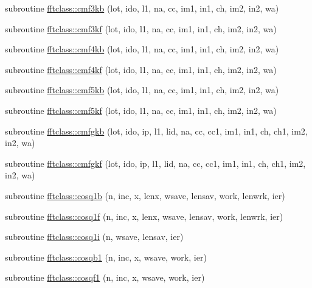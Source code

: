 \begin{DoxyCompactItemize}
\item 
subroutine \mbox{\hyperlink{namespacefftclass_afc9e57527719d38dc3716ee9bf6b090d}{fftclass\+::cmf3kb}} (lot, ido, l1, na, cc, im1, in1, ch, im2, in2, wa)
\item 
subroutine \mbox{\hyperlink{namespacefftclass_a449e799516aa491a87b0f5937a7abc86}{fftclass\+::cmf3kf}} (lot, ido, l1, na, cc, im1, in1, ch, im2, in2, wa)
\item 
subroutine \mbox{\hyperlink{namespacefftclass_ad51087e9f2795e7bf337d4c6b55de780}{fftclass\+::cmf4kb}} (lot, ido, l1, na, cc, im1, in1, ch, im2, in2, wa)
\item 
subroutine \mbox{\hyperlink{namespacefftclass_acdd67c6a77ecec55c036ab8899c07dee}{fftclass\+::cmf4kf}} (lot, ido, l1, na, cc, im1, in1, ch, im2, in2, wa)
\item 
subroutine \mbox{\hyperlink{namespacefftclass_a4bf0caaf1c5caeb50490706cd35d82c5}{fftclass\+::cmf5kb}} (lot, ido, l1, na, cc, im1, in1, ch, im2, in2, wa)
\item 
subroutine \mbox{\hyperlink{namespacefftclass_a59cb57b66516dd0b08cf36e366933c56}{fftclass\+::cmf5kf}} (lot, ido, l1, na, cc, im1, in1, ch, im2, in2, wa)
\item 
subroutine \mbox{\hyperlink{namespacefftclass_ab1c60a144232626a03fad4dd30f88d7d}{fftclass\+::cmfgkb}} (lot, ido, ip, l1, lid, na, cc, cc1, im1, in1, ch, ch1, im2, in2, wa)
\item 
subroutine \mbox{\hyperlink{namespacefftclass_a317b5c8887b5c2ecb7e518f0c7058589}{fftclass\+::cmfgkf}} (lot, ido, ip, l1, lid, na, cc, cc1, im1, in1, ch, ch1, im2, in2, wa)
\item 
subroutine \mbox{\hyperlink{namespacefftclass_a6684b378360642f160b255df6b3aa0bd}{fftclass\+::cosq1b}} (n, inc, x, lenx, wsave, lensav, work, lenwrk, ier)
\item 
subroutine \mbox{\hyperlink{namespacefftclass_a546e80f6eb00444bf4508ae26186e0d2}{fftclass\+::cosq1f}} (n, inc, x, lenx, wsave, lensav, work, lenwrk, ier)
\item 
subroutine \mbox{\hyperlink{namespacefftclass_ab281b0d26ef5d825f00696ab35e18e65}{fftclass\+::cosq1i}} (n, wsave, lensav, ier)
\item 
subroutine \mbox{\hyperlink{namespacefftclass_a4f908baf4cda5a6be5b71eb85fc9309c}{fftclass\+::cosqb1}} (n, inc, x, wsave, work, ier)
\item 
subroutine \mbox{\hyperlink{namespacefftclass_a894b76f80148bf5d923d558356a6cc1a}{fftclass\+::cosqf1}} (n, inc, x, wsave, work, ier)
\item 

\end{DoxyCompactItemize}
